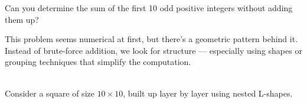 \documentclass{article}
\begin{document}
\begin{example}\label{example:sum-of-first-10-odd}
    Can you determine the sum of the first 10 odd positive integers without adding them up?
      
\end{example}

\begin{analysis*}
    This problem seems numerical at first, but there's a geometric pattern behind it. Instead of brute-force addition, we look for structure — especially using shapes or grouping techniques that simplify the computation.
\end{analysis*}

\begin{soln}\ \\\indent
    Consider a square of size \( 10 \times 10 \), built up layer by layer using nested L-shapes.


\end{soln}
\end{document}
